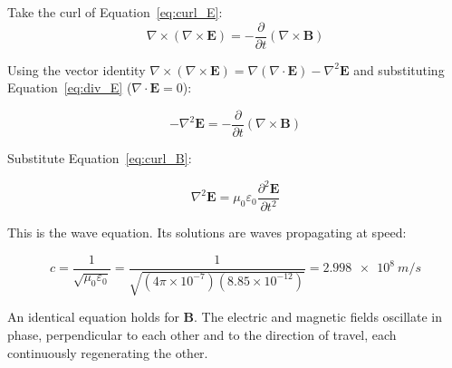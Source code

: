 \documentclass[12pt, a4paper, twoside]{book}
\theoremstyle{disc}
\begin{document}
Take the curl of Equation~\eqref{eq:curl_E}:
\begin{equation}
  \nabla\times(\nabla\times\bm{E}) = -\frac{\partial}{\partial t}(\nabla\times\bm{B})
\end{equation}

Using the vector identity $\nabla\times(\nabla\times\bm{E}) = \nabla(\nabla\cdot\bm{E}) - \nabla^2\bm{E}$ and substituting Equation~\eqref{eq:div_E} ($\nabla\cdot\bm{E}=0$):

\begin{equation}
  -\nabla^2\bm{E} = -\frac{\partial}{\partial t}(\nabla\times\bm{B})
\end{equation}

Substitute Equation~\eqref{eq:curl_B}:

\begin{equation}
  \boxed{\nabla^2\bm{E} = \mu_0\varepsilon_0\frac{\partial^2\bm{E}}{\partial t^2}}
\end{equation}

This is the wave equation. Its solutions are waves propagating at speed:

\begin{equation}
  \boxed{c = \frac{1}{\sqrt{\mu_0\varepsilon_0}}
  = \frac{1}{\sqrt{(4\pi\times10^{-7})(8.85\times10^{-12})}}
  = \SI{2.998e8}{m/s}}
\end{equation}

An identical equation holds for $\bm{B}$. The electric and magnetic fields oscillate in phase, perpendicular to each other and to the direction of travel, each continuously regenerating the other.
\end{document}
